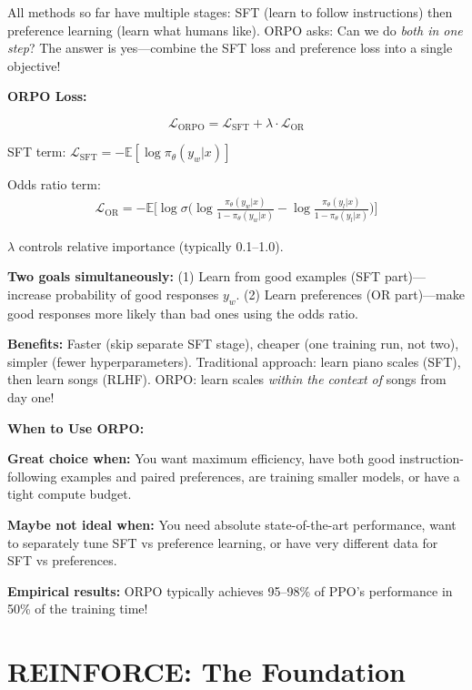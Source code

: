 \begin{chapterenv}
All methods so far have multiple stages: SFT (learn to follow instructions) then preference learning (learn what humans like). ORPO asks: Can we do \textit{both in one step}? The answer is yes---combine the SFT loss and preference loss into a single objective!

\begin{infobox}
\textbf{ORPO Loss:}

$$\mathcal{L}_{\text{ORPO}} = \mathcal{L}_{\text{SFT}} + \lambda \cdot \mathcal{L}_{\text{OR}}$$

SFT term: $\mathcal{L}_{\text{SFT}} = -\mathbb{E}\left[\log \pi_\theta(y_w | x)\right]$

Odds ratio term:
\begin{align*}
\mathcal{L}_{\text{OR}} = -\mathbb{E}\Big[ \log \sigma\Big( \log \frac{\pi_\theta(y_w | x)}{1 - \pi_\theta(y_w | x)} - \log \frac{\pi_\theta(y_l | x)}{1 - \pi_\theta(y_l | x)} \Big) \Big]
\end{align*}

$\lambda$ controls relative importance (typically 0.1--1.0).

\textbf{Two goals simultaneously:} (1) Learn from good examples (SFT part)---increase probability of good responses $y_w$. (2) Learn preferences (OR part)---make good responses more likely than bad ones using the odds ratio.

\textbf{Benefits:} Faster (skip separate SFT stage), cheaper (one training run, not two), simpler (fewer hyperparameters). Traditional approach: learn piano scales (SFT), then learn songs (RLHF). ORPO: learn scales \textit{within the context of} songs from day one!
\end{infobox}

\begin{tipbox}
\textbf{When to Use ORPO:}

\textbf{Great choice when:} You want maximum efficiency, have both good instruction-following examples and paired preferences, are training smaller models, or have a tight compute budget.

\textbf{Maybe not ideal when:} You need absolute state-of-the-art performance, want to separately tune SFT vs preference learning, or have very different data for SFT vs preferences.

\textbf{Empirical results:} ORPO typically achieves 95--98\% of PPO's performance in 50\% of the training time!
\end{tipbox}

\section{REINFORCE: The Foundation}


\end{chapterenv}
